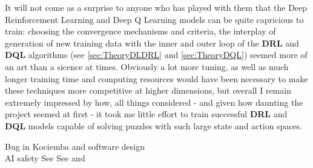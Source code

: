 It will not come as a surprise to anyone who has played with them that the Deep Reinforcement Learning and Deep Q Learning models can be quite capricious to train: choosing the convergence mechanisms and criteria, the interplay of generation of new training data with the inner and outer loop of the \textbf{DRL} and \textbf{DQL} algorithms (see \ref{sec:TheoryDLDRL} and \ref{sec:TheoryDQL}) seemed more of an art than a sicence at times. Obviously a lot more tuning, as well as much longer training time and computing resources would have been necessary to make these techniques more competitive at higher dimensions, but overall I remain extremely impressed by how, all things considered - and given how daunting the project seemed at first - it took me little effort to train successful \textbf{DRL} and \textbf{DQL} models capable of solving puzzles with such large state and action spaces.

Bug in Kociemba and software design\\
AI safety 
See \cite{ManyWorlds}
See \cite{https://doi.org/10.1111/1758-5899.12718} and \cite{Bostrom2014}
